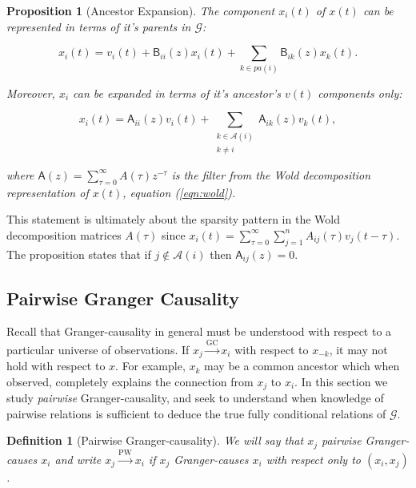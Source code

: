 \documentclass{statsoc}
\def\gc{\overset{\text{GC}}{\rightarrow}}  %
\def\pwgc{\overset{\text{PW}}{\rightarrow}}  %
\def\gcg{\mathcal{G}}  %
\def\B{\mathsf{B}}  %
\def\A{\mathsf{A}}  %
\newcommand{\pa}[1]{pa(#1)}  %
\newcommand{\anc}[1]{\mathcal{A}(#1)}  %
\newtheorem{proposition}{Proposition}
\newtheorem{definition}{Definition}
\begin{document}
\begin{proposition}[Ancestor Expansion]
  \label{prop:parent_expanding}
  The component $x_i(t)$ of $x(t)$ can be represented in terms of it's
  parents in $\gcg$:

  \begin{equation}
    \label{eqn:parent_expansion}
    x_i(t) = v_i(t) + \B_{ii}(z)x_i(t) + \sum_{k \in \pa{i}}\B_{ik}(z)x_k(t).
  \end{equation}

  Moreover, $x_i$ can be expanded in terms of it's ancestor's $v(t)$
  components only:

  \begin{equation}
    \label{eqn:ancestor_expansion}
    x_i(t) = \A_{ii}(z)v_i(t) + \sum_{\substack{k \in \anc{i} \\ k \ne i}}\A_{ik}(z)v_k(t),
  \end{equation}

  where $\A(z) = \sum_{\tau = 0}^\infty A(\tau)z^{-\tau}$ is the filter from
  the Wold decomposition representation of $x(t)$, equation
  (\ref{eqn:wold}).
\end{proposition}

This statement is ultimately about the sparsity pattern in the Wold
decomposition matrices $A(\tau)$ since
$x_i(t) = \sum_{\tau = 0}^\infty \sum_{j = 1}^n A_{ij}(\tau)v_j(t -
\tau)$.  The proposition states that if $j \not \in \anc{i}$ then
$\A_{ij}(z) = 0$.  

\subsection{Pairwise Granger Causality}
\label{sec:pwgc}
Recall that Granger-causality in general must be understood with
respect to a particular universe of observations.  If $x_j \gc x_i$
with respect to $x_{-k}$, it may not hold with respect to $x$.  For
example, $x_k$ may be a common ancestor which when observed, completely
explains the connection from $x_j$ to $x_i$.  In this section we study
\textit{pairwise} Granger-causality, and seek to understand when
knowledge of pairwise relations is sufficient to deduce the true fully
conditional relations of $\gcg$.

\begin{definition}[Pairwise Granger-causality]
  We will say that $x_j$ pairwise Granger-causes $x_i$ and write
  $x_j \pwgc x_i$ if $x_j$ Granger-causes $x_i$ with respect only to
  $(x_i, x_j)$.
\end{definition}
\end{document}

